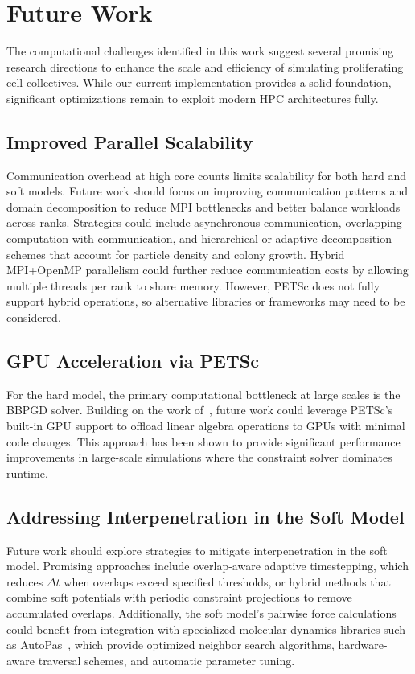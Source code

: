 \documentclass[conference]{IEEEtran}
\begin{document}
\section{Future Work}

The computational challenges identified in this work suggest several promising research directions to enhance the scale and efficiency of simulating proliferating cell collectives. While our current implementation provides a solid foundation, significant optimizations remain to exploit modern HPC architectures fully.

\subsection{Improved Parallel Scalability}

Communication overhead at high core counts limits scalability for both hard and soft models. Future work should focus on improving communication patterns and domain decomposition to reduce MPI bottlenecks and better balance workloads across ranks. Strategies could include asynchronous communication, overlapping computation with communication, and hierarchical or adaptive decomposition schemes that account for particle density and colony growth. Hybrid MPI+OpenMP parallelism could further reduce communication costs by allowing multiple threads per rank to share memory. However, PETSc does not fully support hybrid operations, so alternative libraries or frameworks may need to be considered.

\subsection{GPU Acceleration via PETSc}

For the hard model, the primary computational bottleneck at large scales is the BBPGD solver. Building on the work of~\cite{Tasora2008}, future work could leverage PETSc's built-in GPU support to offload linear algebra operations to GPUs with minimal code changes. This approach has been shown to provide significant performance improvements in large-scale simulations where the constraint solver dominates runtime.

\subsection{Addressing Interpenetration in the Soft Model}

Future work should explore strategies to mitigate interpenetration in the soft model. Promising approaches include overlap-aware adaptive timestepping, which reduces $\Delta t$ when overlaps exceed specified thresholds, or hybrid methods that combine soft potentials with periodic constraint projections to remove accumulated overlaps. Additionally, the soft model's pairwise force calculations could benefit from integration with specialized molecular dynamics libraries such as AutoPas~\cite{Gratl2019,Newcome2023}, which provide optimized neighbor search algorithms, hardware-aware traversal schemes, and automatic parameter tuning.
\end{document}

